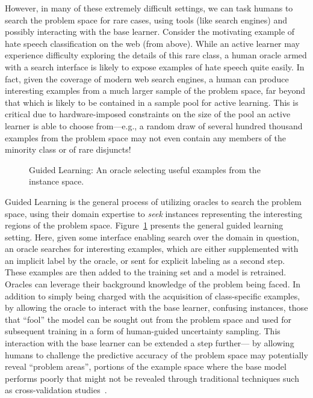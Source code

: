 However, in many of these extremely difficult settings, we can task humans to search the problem space for rare cases, using tools (like search engines) and possibly interacting with the base learner. Consider the motivating example of hate speech classification on the web (from above). While an active learner may experience difficulty exploring the details of this rare class, a human oracle armed with a search interface is likely to expose examples of hate speech quite easily. In fact, given the coverage of modern web search engines, a human can produce interesting examples from a much larger sample of the problem space, far beyond that which is likely to be contained in a sample pool for active learning. This is critical due to hardware-imposed constraints on the size of the pool an active learner is able to choose from---e.g., a random draw of several hundred thousand examples from the problem space may not even contain any members of the minority class or of rare disjuncts!

\begin{figure}[t!]
\begin{center}
\end{center}
\caption{Guided Learning: An oracle selecting useful examples from the instance space. }
\label{fig:guidedlearning}
\end{figure}

Guided Learning is the general process of utilizing oracles to search the problem space, using their domain expertise to \emph{seek} instances representing the interesting regions of the problem space.
Figure~\ref{fig:guidedlearning} presents the general guided learning setting. Here, given some interface enabling search over the domain in question, an oracle searches for interesting examples, which are either supplemented with an implicit label by the oracle, or sent for explicit labeling as a second step. These examples are then added to the training set and a model is retrained.
Oracles can leverage their background knowledge of the problem being faced. In addition to simply being charged with the acquisition of class-specific examples, by allowing the oracle to interact with the base learner, confusing instances, those that ``fool'' the model can be sought out from the problem space and used for subsequent training in a form of human-guided uncertainty sampling. This interaction with the base learner can be extended a step further--- by allowing humans to challenge the predictive accuracy of the problem space may potentially reveal ``problem areas'', portions of the example space where the base model performs poorly that might not be revealed through traditional techniques such as cross-validation studies~\cite{attenberg:hcomp2011}.


